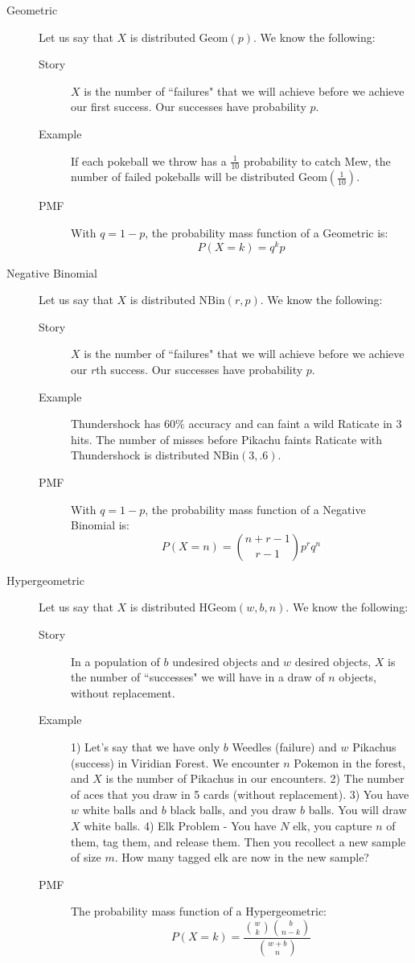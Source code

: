 \documentclass[10pt,landscape]{article}
\theoremstyle{definition}
\newcommand{\Geom}{\textrm{Geom}}
\newcommand{\NBin}{\textrm{NBin}}
\newcommand{\Hypergeometric}{\textrm{HGeom}}
\begin{document}
\begin{multicols}{3}
\begin{description}
\item[Geometric] Let us say that $X$ is distributed $\Geom(p)$. We know the following:
\begin{description}
    \item[Story] $X$ is the number of ``failures" that we will achieve before we achieve our first success. Our successes have probability $p$.
    \item[Example] If each pokeball we throw has a $\frac{1}{10}$ probability to catch Mew, the number of failed pokeballs will be distributed $\Geom(\frac{1}{10})$.
    \item[PMF] With $q = 1-p$, the probability mass function of a Geometric is:
\[P(X = k) = q^kp\]
\end{description}



\item[Negative Binomial] Let us say that $X$ is distributed $\NBin(r, p)$. We know the following:
\begin{description}
    \item[Story] $X$ is the number of ``failures" that we will achieve before we achieve our $r$th success. Our successes have probability $p$.
    \item[Example] Thundershock has 60\% accuracy and can faint a wild Raticate in 3 hits. The number of misses before Pikachu faints Raticate with Thundershock is distributed $\NBin(3, .6)$.
    \item[PMF] With $q = 1-p$, the probability mass function of a Negative Binomial is:
\[P(X = n) = {n+r - 1 \choose r -1}p^rq^n\]
\end{description}

\item[Hypergeometric] Let us say that $X$ is distributed $\Hypergeometric(w, b, n)$. We know the following:
\begin{description}
    \item[Story] In a population of $b$ undesired objects and $w$ desired objects, $X$ is the number of ``successes" we will have in a draw of $n$ objects, without replacement.
    \item[Example] 1) Let's say that we have only $b$ Weedles (failure) and $w$ Pikachus (success) in Viridian Forest. We encounter $n$ Pokemon in the forest, and $X$ is the number of Pikachus in our encounters. 2) The number of aces that you draw in 5 cards (without replacement). 3) You have $w$ white balls and $b$ black balls, and you draw $b$ balls. You will draw $X$ white balls. 4) Elk Problem - You have $N$ elk, you capture $n$ of them, tag them, and release them. Then you recollect a new sample of size $m$. How many tagged elk are now in the new sample?
    \item[PMF] The probability mass function of a Hypergeometric:
\[P(X = k) = \frac{{w \choose k}{b \choose n-k}}{{w + b \choose n}}\]
\end{description}



\end{description}
\end{multicols}
\end{document}
